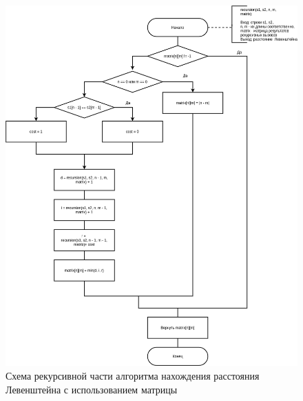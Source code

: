 \begin{figure}[H]
	\begin{center}
		\includegraphics[scale=0.5]{img/recursion.png}
	\end{center}
	\captionsetup{justification=centering}
	\caption{Схема рекурсивной части алгоритма нахождения расстояния Левенштейна с использованием матрицы}
	\label{img:recursion}
\end{figure}

